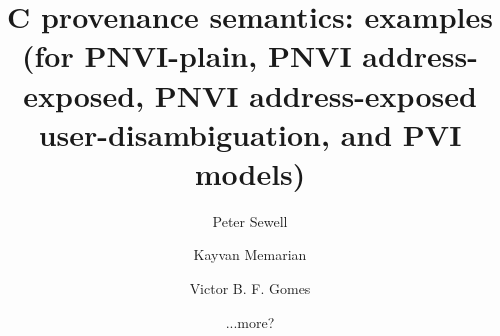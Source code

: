 \documentclass[acmsmall,review,screen]{acmart}\settopmatter{printfolios=true,printccs=false,printacmref=false}
\newif\ifWGfourteennumber
\begin{document}
\ifWGfourteennumber
\fancypagestyle{firstpagestyle}{%
\fancyhf{} %
\fancyhead[C]{ISO/IEC JTC1/SC22/WG14 N2311, 2018-11-09} %
\renewcommand{\headrulewidth}{0pt}
\renewcommand{\footrulewidth}{0pt}}
\thispagestyle{plain}
\fi

\title[C provenance semantics: examples]{C provenance semantics: examples
(for PNVI-plain, PNVI address-exposed, PNVI address-exposed 
user-disambiguation, and PVI models)}


\authorsaddresses{}



\author{Peter Sewell}

 \author{Kayvan Memarian}
% 
% 
 \author{Victor B. F. Gomes}

 \author{...more?}

 
\renewcommand{\shortauthors}{Sewell, Memarian, Gomes}

\end{document}
